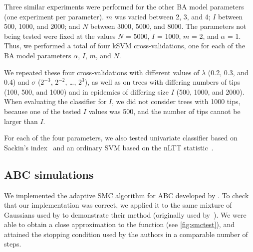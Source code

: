 \documentclass[12pt]{article}\usepackage[]{graphicx}\usepackage[]{color}
\begin{document}
Three similar experiments were performed for the other \gls{BA} model
parameters (one experiment per parameter). $m$ was varied between 2, 3, and 4;
$I$ between 500, 1000, and 2000; and $N$ between 3000, 5000, and 8000. The
parameters not being tested were fixed at the values $N$ = 5000, $I$ = 1000,
$m$ = 2, and $\alpha$ = 1. Thus, we performed a total of four kSVM
cross-validations, one for each of the \gls{BA} model parameters $\alpha$, $I$,
$m$, and $N$.

We repeated these four cross-validations with different values of $\lambda$
(0.2, 0.3, and 0.4) and $\sigma$ ($2^{-3}$, $2^{-2}$, \ldots, $2^3$), as well
as on trees with differing numbers of tips (100, 500, and 1000) and in
epidemics of differing size $I$ (500, 1000, and 2000). When evaluating the
classifier for $I$, we did not consider trees with 1000 tips, because one of
the tested $I$ values was 500, and the number of tips cannot be larger than
$I$.

For each of the four parameters, we also tested univariate classifier based on
Sackin's index~\autocite{shao1990tree} and an ordinary SVM based on the
\gls{nLTT} statistic~\autocite{janzen2015approximate}.

\subsection*{ABC simulations}

We implemented the adaptive \gls{SMC} algorithm for \gls{ABC} developed by
\textcite{del2012adaptive}. To check that our implementation was correct, we
applied it to the same mixture of Gaussians used by
\citeauthor{del2012adaptive} to demonstrate their method (originally used
by~\textcite{sisson2007sequential}). We were able to obtain a close
approximation to the function (see \cref{fig:smctest}), and attained the
stopping condition used by the authors in a comparable number of steps.
\end{document}
